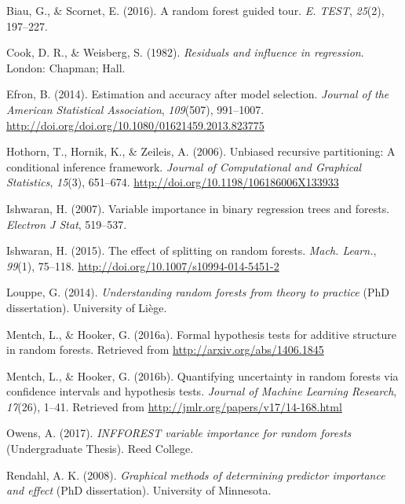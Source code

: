 \documentclass[12pt,twoside]{reedthesis}
\theoremstyle{definition}
\theoremstyle{definition}
\theoremstyle{definition}
\theoremstyle{remark}
\begin{document}
\setlength{\parindent}{-0.20in} \setlength{\leftskip}{0.20in}
\setlength{\parskip}{8pt}

\hypertarget{refs}{}
\hypertarget{ref-biau2015a}{}
Biau, G., \& Scornet, E. (2016). A random forest guided tour. \emph{E.
TEST}, \emph{25}(2), 197--227.

\hypertarget{ref-cook1982}{}
Cook, D. R., \& Weisberg, S. (1982). \emph{Residuals and influence in
regression}. London: Chapman; Hall.

\hypertarget{ref-efron2014}{}
Efron, B. (2014). Estimation and accuracy after model selection.
\emph{Journal of the American Statistical Association}, \emph{109}(507),
991--1007. \url{http://doi.org/doi.org/10.1080/01621459.2013.823775}

\hypertarget{ref-hothorn2006}{}
Hothorn, T., Hornik, K., \& Zeileis, A. (2006). Unbiased recursive
partitioning: A conditional inference framework. \emph{Journal of
Computational and Graphical Statistics}, \emph{15}(3), 651--674.
\url{http://doi.org/10.1198/106186006X133933}

\hypertarget{ref-ishwaran2007}{}
Ishwaran, H. (2007). Variable importance in binary regression trees and
forests. \emph{Electron J Stat}, 519--537.

\hypertarget{ref-ishwaran2015}{}
Ishwaran, H. (2015). The effect of splitting on random forests.
\emph{Mach. Learn.}, \emph{99}(1), 75--118.
\url{http://doi.org/10.1007/s10994-014-5451-2}

\hypertarget{ref-louppe2014}{}
Louppe, G. (2014). \emph{Understanding random forests from theory to
practice} (PhD dissertation). University of Liège.

\hypertarget{ref-mentch2016b}{}
Mentch, L., \& Hooker, G. (2016a). Formal hypothesis tests for additive
structure in random forests. Retrieved from
\url{http://arxiv.org/abs/1406.1845}

\hypertarget{ref-mentch2016a}{}
Mentch, L., \& Hooker, G. (2016b). Quantifying uncertainty in random
forests via confidence intervals and hypothesis tests. \emph{Journal of
Machine Learning Research}, \emph{17}(26), 1--41. Retrieved from
\url{http://jmlr.org/papers/v17/14-168.html}

\hypertarget{ref-owens2017}{}
Owens, A. (2017). \emph{INFFOREST variable importance for random
forests} (Undergraduate Thesis). Reed College.

\hypertarget{ref-rendahl2008}{}
Rendahl, A. K. (2008). \emph{Graphical methods of determining predictor
importance and effect} (PhD dissertation). University of Minnesota.
\end{document}
